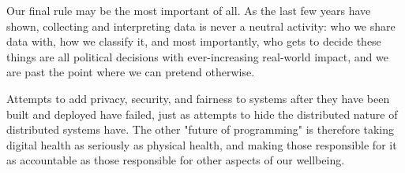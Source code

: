 \documentclass[10pt,letterpaper]{article}
\begin{document}
Our final rule may be the most important of all.  As the last few years have
shown, collecting and interpreting data is never a neutral activity: who we
share data with, how we classify it, and most importantly, who gets to decide
these things are all political decisions with ever-increasing real-world impact,
and we are past the point where we can pretend otherwise.

Attempts to add privacy, security, and fairness to systems after they have been
built and deployed have failed, just as attempts to hide the distributed nature
of distributed systems have.  The other "future of programming" is therefore
taking digital health as seriously as physical health, and making those
responsible for it as accountable as those responsible for other aspects of our
wellbeing.


\end{document}
